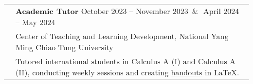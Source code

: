 \documentclass[letterpaper, 11pt]{article}
\newcommand{\spaceand}{\,\&\ \,}
\begin{document}
\begin{center}
\begin{longtable}{p{0.76in}p{5.93in}}
        & \textbf{Academic Tutor} \hfill October 2023 -- November 2023 \spaceand April 2024 -- May 2024\\
        & Center of Teaching and Learning Development, National Yang Ming Chiao Tung University\\
        & Tutored international students in Calculus A (I) and Calculus A (II), conducting weekly sessions and creating \href{https://github.com/eiken59/2024_II_Tutor}{handouts} in \LaTeX.\\





        
        
    \end{longtable}
\end{center}
\end{document}
